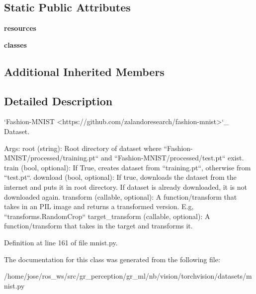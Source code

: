 \subsection*{Static Public Attributes}
\begin{DoxyCompactItemize}
\item 
\mbox{\label{classtorchvision_1_1datasets_1_1mnist_1_1FashionMNIST_a4c491f9b11cef56de5ea2f9e15da95a8}} 
{\bfseries resources}
\item 
\mbox{\label{classtorchvision_1_1datasets_1_1mnist_1_1FashionMNIST_a82ea6e08be0306ee9194a911f8be9768}} 
{\bfseries classes}
\end{DoxyCompactItemize}
\subsection*{Additional Inherited Members}


\subsection{Detailed Description}
\begin{DoxyVerb}`Fashion-MNIST <https://github.com/zalandoresearch/fashion-mnist>`_ Dataset.

Args:
    root (string): Root directory of dataset where ``Fashion-MNIST/processed/training.pt``
        and  ``Fashion-MNIST/processed/test.pt`` exist.
    train (bool, optional): If True, creates dataset from ``training.pt``,
        otherwise from ``test.pt``.
    download (bool, optional): If true, downloads the dataset from the internet and
        puts it in root directory. If dataset is already downloaded, it is not
        downloaded again.
    transform (callable, optional): A function/transform that  takes in an PIL image
        and returns a transformed version. E.g, ``transforms.RandomCrop``
    target_transform (callable, optional): A function/transform that takes in the
        target and transforms it.
\end{DoxyVerb}
 

Definition at line 161 of file mnist.\+py.



The documentation for this class was generated from the following file\+:\begin{DoxyCompactItemize}
\item 
/home/jose/ros\+\_\+ws/src/gr\+\_\+perception/gr\+\_\+ml/nb/vision/torchvision/datasets/mnist.\+py\end{DoxyCompactItemize}
